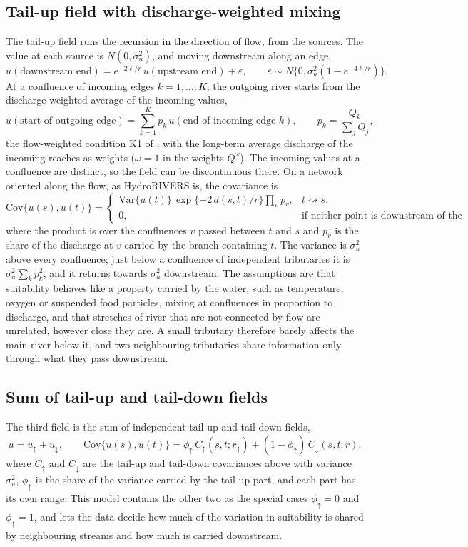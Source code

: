\documentclass[11pt,a4paper]{article}
\newcommand{\Cov}{\mathrm{Cov}}
\newcommand{\Var}{\mathrm{Var}}
\begin{document}
\subsection*{Tail-up field with discharge-weighted mixing}

The tail-up field runs the recursion in the direction of flow, from the sources. The value at each source is $N(0, \sigma_u^2)$, and moving downstream along an edge,
\[
u(\text{downstream end}) = e^{-2\ell/r}\, u(\text{upstream end}) + \varepsilon, \qquad \varepsilon \sim N\{0, \sigma_u^2(1 - e^{-4\ell/r})\}.
\]
At a confluence of incoming edges $k = 1, \dots, K$, the outgoing river starts from the discharge-weighted average of the incoming values,
\[
u(\text{start of outgoing edge}) = \sum_{k=1}^K p_k\, u(\text{end of incoming edge } k), \qquad p_k = \frac{Q_k}{\sum_{j} Q_j},
\]
the flow-weighted condition K1 of \citet{bolin2026dir}, with the long-term average discharge of the incoming reaches as weights ($\omega = 1$ in the weights $Q^\omega$). The incoming values at a confluence are distinct, so the field can be discontinuous there. On a network oriented along the flow, as HydroRIVERS is, the covariance is
\[
\Cov\{u(s), u(t)\} = \begin{cases} \Var\{u(t)\}\, \exp\{-2\,d(s, t)/r\} \prod_{v} p_v, & t \rightsquigarrow s, \\ 0, & \text{if neither point is downstream of the other,} \end{cases}
\]
where the product is over the confluences $v$ passed between $t$ and $s$ and $p_v$ is the share of the discharge at $v$ carried by the branch containing $t$. The variance is $\sigma_u^2$ above every confluence; just below a confluence of independent tributaries it is $\sigma_u^2 \sum_k p_k^2$, and it returns towards $\sigma_u^2$ downstream. The assumptions are that suitability behaves like a property carried by the water, such as temperature, oxygen or suspended food particles, mixing at confluences in proportion to discharge, and that stretches of river that are not connected by flow are unrelated, however close they are. A small tributary therefore barely affects the main river below it, and two neighbouring tributaries share information only through what they pass downstream.

\subsection*{Sum of tail-up and tail-down fields}

The third field is the sum of independent tail-up and tail-down fields,
\[
u = u_{\uparrow} + u_{\downarrow}, \qquad \Cov\{u(s), u(t)\} = \phi_\uparrow\, C_\uparrow(s, t; r_\uparrow) + (1 - \phi_\uparrow)\, C_\downarrow(s, t; r),
\]
where $C_\uparrow$ and $C_\downarrow$ are the tail-up and tail-down covariances above with variance $\sigma_u^2$, $\phi_\uparrow$ is the share of the variance carried by the tail-up part, and each part has its own range. This model contains the other two as the special cases $\phi_\uparrow = 0$ and $\phi_\uparrow = 1$, and lets the data decide how much of the variation in suitability is shared by neighbouring streams and how much is carried downstream.
\end{document}
